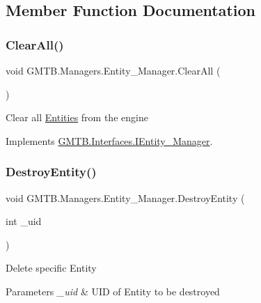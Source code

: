 \subsection{Member Function Documentation}
\mbox{\label{class_g_m_t_b_1_1_managers_1_1_entity___manager_a9175e841b277d7773d4ee40f71b3a3fd}} 
\subsubsection{\texorpdfstring{ClearAll()}{ClearAll()}}
{\footnotesize\ttfamily void G\+M\+T\+B.\+Managers.\+Entity\+\_\+\+Manager.\+Clear\+All (\begin{DoxyParamCaption}{ }\end{DoxyParamCaption})}



Clear all \mbox{\hyperlink{namespace_g_m_t_b_1_1_entities}{Entities}} from the engine 



Implements \mbox{\hyperlink{interface_g_m_t_b_1_1_interfaces_1_1_i_entity___manager}{G\+M\+T\+B.\+Interfaces.\+I\+Entity\+\_\+\+Manager}}.

\mbox{\label{class_g_m_t_b_1_1_managers_1_1_entity___manager_ab8b0bb504faeca844a504b33b08a31ee}} 
\subsubsection{\texorpdfstring{DestroyEntity()}{DestroyEntity()}}
{\footnotesize\ttfamily void G\+M\+T\+B.\+Managers.\+Entity\+\_\+\+Manager.\+Destroy\+Entity (\begin{DoxyParamCaption}\item[{int}]{\+\_\+uid }\end{DoxyParamCaption})}



Delete specific Entity 


\begin{DoxyParams}{Parameters}
{\em \+\_\+uid} & U\+ID of Entity to be destroyed \\
\hline
\end{DoxyParams}


